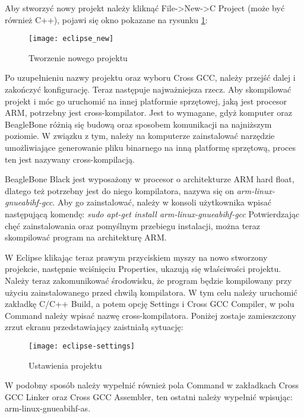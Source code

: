 Aby stworzyć nowy projekt należy kliknąć File->New->C Project (może być również C++), pojawi się okno pokazane na rysunku \ref{fig:eclipse_new}:

\begin{figure}[h!]
\centering
\texttt{[image: eclipse\_new]}
\caption{Tworzenie nowego projektu}
\label{fig:eclipse_new}
\end{figure}

Po uzupełnieniu nazwy projektu oraz wyboru Cross GCC, należy przejść dalej i zakończyć konfigurację. Teraz następuje najważniejsza rzecz. Aby skompilować projekt i móc go uruchomić na innej platformie sprzętowej, jaką jest procesor ARM, potrzebny jest cross-kompilator. Jest to wymagane, gdyż komputer oraz BeagleBone różnią się budową oraz sposobem komunikacji na najniższym poziomie. W związku z tym, należy na komputerze zainstalować narzędzie umożliwiające generowanie pliku binarnego na inną platformę sprzętową, proces ten jest nazywany cross-kompilacją.

BeagleBone Black jest wyposażony w procesor o architekturze ARM hard float, dlatego też potrzebny jest do niego kompilatora, nazywa się on \emph{arm-linux-gnueabihf-gcc}. Aby go zainstalować, należy w konsoli użytkownika wpisać następującą komendę:\newline
\emph{sudo apt-get install arm-linux-gnueabihf-gcc}\newline
Potwierdzając chęć zainstalowania oraz pomyślnym przebiegu instalacji, można teraz skompilować program na architekturę ARM.

W Eclipse klikając teraz prawym przyciskiem myszy na nowo stworzony projekcie, następnie wciśnięciu Properties, ukazują się właściwości projektu. Należy teraz zakomunikować środowisku, że program będzie kompilowany przy użyciu zainstalowanego przed chwilą kompilatora. W tym celu należy uruchomić zakładkę C/C++ Build, a potem opcję Settings i Cross GCC Compiler, w polu Command należy wpisać nazwę cross-kompilatora. Poniżej zostaje zamieszczony zrzut ekranu przedstawiający zaistniałą sytuację:

\begin{figure}[h]
\centering
\texttt{[image: eclipse-settings]}
\caption{Ustawienia projektu}
\label{fig:eclipse-settings}
\end{figure}

W podobny sposób należy wypełnić również pola Command w zakładkach Cross GCC Linker oraz Cross GCC Assembler, ten ostatni należy wypełnić wpisując: arm-linux-gnueabihf-as.

